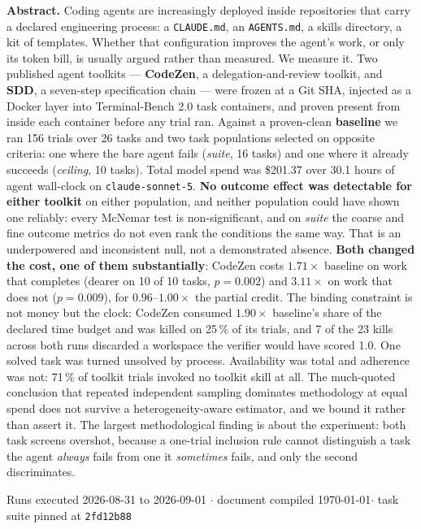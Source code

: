 \documentclass[11pt,a4paper]{article}
\newcommand{\code}[1]{\texttt{\small #1}}
\begin{document}
\begin{titlepage}
\begin{minipage}{0.86\linewidth}\small
\textbf{Abstract.} Coding agents are increasingly deployed inside repositories that carry a
declared engineering process: a \code{CLAUDE.md}, an \code{AGENTS.md}, a skills directory, a
kit of templates. Whether that configuration improves the agent's work, or only its token
bill, is usually argued rather than measured. We measure it. Two published agent toolkits
--- \textbf{CodeZen}, a delegation-and-review toolkit, and \textbf{SDD}, a seven-step
specification chain --- were frozen at a Git SHA, injected as a Docker layer into
Terminal-Bench 2.0 task containers, and proven present from inside each container before any
trial ran. Against a proven-clean \textbf{baseline} we ran 156 trials over 26 tasks and two
task populations selected on opposite criteria: one where the bare agent fails
(\emph{suite}, 16 tasks) and one where it already succeeds (\emph{ceiling}, 10 tasks). Total
model spend was \$201.37 over 30.1 hours of agent wall-clock on \code{claude-sonnet-5}.
\textbf{No outcome effect was detectable for either toolkit} on either population, and
neither population could have shown one reliably: every McNemar test is non-significant, and
on \emph{suite} the coarse and fine outcome metrics do not even rank the conditions the same
way. That is an underpowered and inconsistent null, not a demonstrated absence.
\textbf{Both changed the cost, one of them substantially}: CodeZen costs $1.71\times$
baseline on work that completes (dearer on 10 of 10 tasks, $p = 0.002$) and $3.11\times$ on
work that does not ($p = 0.009$), for $0.96$--$1.00\times$ the partial credit. The binding
constraint is not money but the clock: CodeZen consumed $1.90\times$ baseline's share of the
declared time budget and was killed on 25\,\% of its trials, and 7 of the 23 kills across
both runs discarded a workspace the verifier would have scored 1.0. One solved task was
turned unsolved by process. Availability was total and adherence was not: 71\,\% of toolkit
trials invoked no toolkit skill at all. The much-quoted conclusion that repeated independent
sampling dominates methodology at equal spend does not survive a heterogeneity-aware
estimator, and we bound it rather than assert it. The largest methodological finding is
about the experiment: both task screens overshot, because a one-trial inclusion rule cannot
distinguish a task the agent \emph{always} fails from one it \emph{sometimes} fails, and only
the second discriminates.
\end{minipage}

\vfill
{\small\color{black!55}Runs executed 2026-08-31 to 2026-09-01 \quad$\cdot$\quad
document compiled \today \quad$\cdot$\quad
task suite pinned at \code{2fd12b88}}
\end{titlepage}
\end{document}
